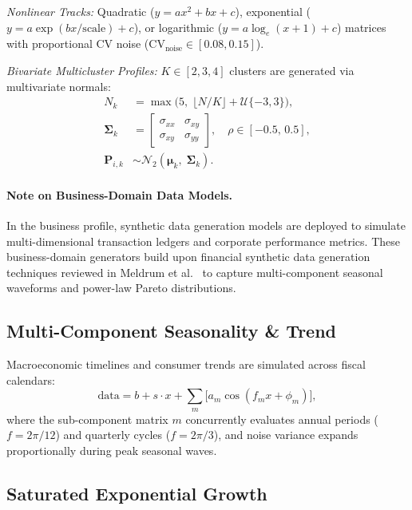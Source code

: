 \documentclass[11pt,twocolumn]{article}
\newcommand{\N}{\mathcal{N}}
\begin{document}
\noindent\emph{Nonlinear Tracks:} Quadratic ($y = ax^2 + bx + c$), exponential ($y = a\exp(bx/\text{scale}) + c$), or logarithmic ($y = a\log_e(x+1)+c$) matrices with proportional CV noise ($\text{CV}_{\text{noise}} \in [0.08, 0.15]$).

\noindent\emph{Bivariate Multicluster Profiles:}
$K \in [2,3,4]$ clusters are generated via multivariate normals:
\begin{align}
  N_k &= \max\bigl(5,\;\lfloor N/K \rfloor + \mathcal{U}\{-3,3\}\bigr), \label{eq:cluster_size}\\
  \bm{\Sigma}_k &= \begin{bmatrix} \sigma_{xx} & \sigma_{xy}\\ \sigma_{xy} & \sigma_{yy}\end{bmatrix},\quad \rho \in [-0.5,\,0.5], \label{eq:cluster_cov}\\
  \mathbf{P}_{i,k} &\sim \N_2(\bm{\mu}_k,\;\bm{\Sigma}_k). \label{eq:cluster_sample}
\end{align}

\paragraph{Note on Business-Domain Data Models.}
In the business profile, synthetic data generation models are deployed to simulate multi-dimensional transaction ledgers and corporate performance metrics.
These business-domain generators build upon financial synthetic data generation techniques reviewed in Meldrum et al.~\cite{meldrum2025newmoney} to capture multi-component seasonal waveforms and power-law Pareto distributions.

\subsection{Multi-Component Seasonality \& Trend}\label{sec:seasonal}

Macroeconomic timelines and consumer trends are simulated across fiscal calendars:
\begin{equation}\label{eq:seasonal}
  \text{data} = b + s \cdot x + \sum_{m}\bigl[a_m \cos(f_m x + \phi_m)\bigr],
\end{equation}
where the sub-component matrix $m$ concurrently evaluates annual periods ($f = 2\pi/12$) and quarterly cycles ($f = 2\pi/3$), and noise variance expands proportionally during peak seasonal waves.

\subsection{Saturated Exponential Growth}\label{sec:satgrowth}
\end{document}
